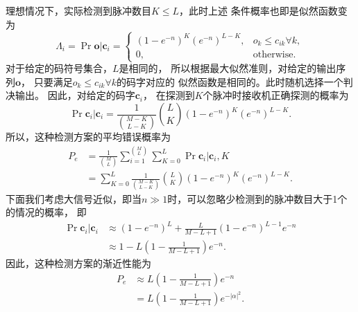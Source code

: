 理想情况下，实际检测到脉冲数目$K \le L$，此时上述
条件概率也即是似然函数变为
\begin{equation}
\Lambda_i = \Pr{\bm{o} | \bm{c}_i} = \begin{cases} 
                                        \left(1 - e^{-n} \right)^{K} \left(e^{-n} \right)^{L-K}, & o_k \le c_{ik} \forall k,\\
                                        0,                                                       & \text{otherwise}.
                                    \end{cases}
\end{equation}
对于给定的码符号集合，$L$是相同的，
所以根据最大似然准则，对给定的输出序列$\bm{o}$，
只要满足$o_k \le c_{ik} \forall k$的码字对应的
似然函数是相同的。此时随机选择一个判决输出。
因此，对给定的码字$\bm{c}_i$，
在探测到$K$个脉冲时接收机正确探测的概率为
\begin{equation}
\Pr{\bm{c}_i | \bm{c}_i} = \frac{1}{\binom{M-K}{L-K}} \binom{L}{K} \left(1 - e^{-n} \right)^{K} \left(e^{-n} \right)^{L-K}.
\end{equation}
所以，这种检测方案的平均错误概率为
\begin{equation}
\begin{split}
P_e &= \frac{1}{\binom{M}{L}}\sum_{i=1}^{\binom{M}{L}} \sum_{K=0}^{L} \Pr{\bm{c}_i | \bm{c}_i, K}  \\
    &= \sum_{K=0}^{L} \frac{1}{\binom{M-K}{L-K}} \binom{L}{K} \left(1 - e^{-n} \right)^{K} \left(e^{-n} \right)^{L-K}.
\end{split}
\end{equation}
下面我们考虑大信号近似，即当$n \gg 1$时，可以忽略少检测到的脉冲数目大于1个的情况的概率，
即
\begin{equation}
\begin{split}
\Pr{\bm{c}_i | \bm{c}_i} &\approx (1-e^{-n})^L + \frac{L}{M-L+1} (1-e^{-n})^{L-1} e^{-n} \\
                            &\approx 1 - L\left(1 - \frac{1}{M-L+1} \right)e^{-n}.
\end{split}
\end{equation}
因此，这种检测方案的渐近性能为
\begin{equation}
\begin{split}
P_e & \approx L\left(1 - \frac{1}{M-L+1} \right)e^{-n} \\
    & = L\left(1 - \frac{1}{M-L+1} \right)e^{-|\alpha|^2}.
\end{split}
\end{equation}



